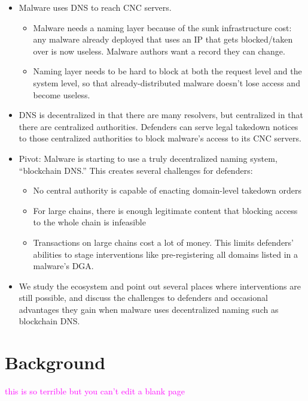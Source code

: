 \documentclass[10pt,sigconf,letterpaper]{acmart}
\newcommand{\randall}{\ding{110}\ding{43}\textcolor{magenta}}
\newcommand{\randall}{}
\begin{document}
\begin{itemize}
	\item Malware uses DNS to reach CNC servers. 
	\begin{itemize}
		\item Malware needs a naming layer because of the 
		sunk infrastructure cost: 
		any malware already deployed that uses an IP that gets blocked/taken 
		over is now useless. Malware authors want a record they can change.
		\item Naming layer needs to be hard to block at both 
		the request level and the system level, so that 
		already-distributed malware doesn't lose access and 
		become useless. 
	\end{itemize}
	\item DNS is decentralized in that there are many resolvers, but 
	centralized in that there are centralized authorities. Defenders can serve 
	legal takedown notices to those centralized authorities to block malware's 
	access to its CNC servers.
	\item Pivot: Malware is starting to use a truly decentralized naming 
	system, ``blockchain DNS.'' This creates several challenges for defenders:
	\begin{itemize}
		\item No central authority is capable of enacting domain-level takedown 
		orders
		\item For large chains, there is enough legitimate content that 
		blocking access to the whole chain is infeasible
		\item Transactions on large chains cost a lot of money. This limits 
		defenders' abilities to stage interventions like pre-registering all 
		domains listed in a malware's DGA.
	\end{itemize}
	\item We study the ecosystem and point out several places where 
	interventions are still possible, and discuss the challenges to defenders 
	and occasional advantages they gain when malware uses decentralized naming 
	such as blockchain DNS.
\end{itemize}

\section{Background}

\randall{this is so terrible but you can't edit a blank page}
\end{document}

